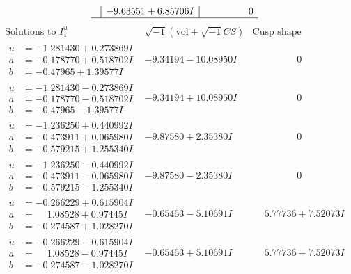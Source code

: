\documentclass[1p]{elsarticle_modified}
\theoremstyle{definition}
\newcommand{\I}{\sqrt{-1}}
\begin{document}
$$\begin{array}{c|c|c}
 & -9.63551 + 6.85706 I & \phantom{-0.000000 } 0\\
 \hline 
 \end{array}$$\newpage$$\begin{array}{c|c|c}  
\text{Solutions to }I^u_{1}& \I (\text{vol} + \sqrt{-1}CS) & \text{Cusp shape}\\
 \hline 
\begin{aligned}
u &= -1.281430 + 0.273869 I \\
a &= -0.178770 + 0.518702 I \\
b &= -0.47965 + 1.39577 I\end{aligned}
 & -9.34194 - 10.08950 I & \phantom{-0.000000 } 0 \\ \hline\begin{aligned}
u &= -1.281430 - 0.273869 I \\
a &= -0.178770 - 0.518702 I \\
b &= -0.47965 - 1.39577 I\end{aligned}
 & -9.34194 + 10.08950 I & \phantom{-0.000000 } 0 \\ \hline\begin{aligned}
u &= -1.236250 + 0.440992 I \\
a &= -0.473911 + 0.065980 I \\
b &= -0.579215 + 1.255340 I\end{aligned}
 & -9.87580 + 2.35380 I & \phantom{-0.000000 } 0 \\ \hline\begin{aligned}
u &= -1.236250 - 0.440992 I \\
a &= -0.473911 - 0.065980 I \\
b &= -0.579215 - 1.255340 I\end{aligned}
 & -9.87580 - 2.35380 I & \phantom{-0.000000 } 0 \\ \hline\begin{aligned}
u &= -0.266229 + 0.615904 I \\
a &= \phantom{-}1.08528 + 0.97445 I \\
b &= -0.274587 + 1.028270 I\end{aligned}
 & -0.65463 - 5.10691 I & \phantom{-}5.77736 + 7.52073 I \\ \hline\begin{aligned}
u &= -0.266229 - 0.615904 I \\
a &= \phantom{-}1.08528 - 0.97445 I \\
b &= -0.274587 - 1.028270 I\end{aligned}
 & -0.65463 + 5.10691 I & \phantom{-}5.77736 - 7.52073 I \\ \hline\begin{aligned}

\end{aligned}
\end{array}$$
\end{document}
